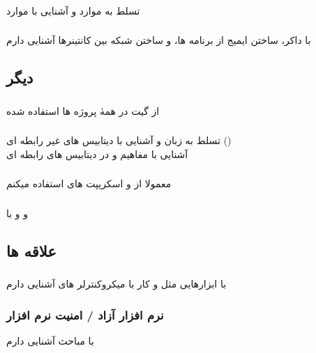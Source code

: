 \documentclass{article}
\begin{document}
\subsubsection{}
تسلط به موارد  و آشنایی با موارد 
\subsubsection{}
با داکر، ساختن ایمیج از برنامه ها،
 و ساختن شبکه بین کانتینرها آشنایی دارم 
\subsection{دیگر}
\subsubsection{}
از گیت در همهٰ پروژه ها استفاده شده
\subsubsection{}
تسلط به زبان  و  
آشنایی با دیتابیس های غیر رابطه ای () \\
آشنایی با مفاهیم  و  در دیتابیس های رابطه ای
\subsubsection{}
معمولا از  و اسکریپت های  استفاده میکنم
\subsubsection{}
 و  و  با 
\subsubsection{}
\subsection{علاقه ها}
\subsubsection{}
با ابزارهایی مثل  و کار با میکروکنترلر های  آشنایی دارم
\subsubsection{نرم افزار آزاد / امنیت نرم افزار}
با مباحث  آشنایی دارم
\end{document}
